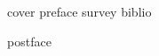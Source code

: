 \documentclass[utf8x, sts, 14pt, a4paper,oneside,fleqn]{extarticle}
\begin{document}
    \begin{onehalfspacing}
        {cover}
        {preface}
        \pagebreak
        \tableofcontents
        \pagebreak
        \pagebreak
        {survey}
        \pagebreak
        {biblio}

        {postface}
        \printindex
    \end{onehalfspacing}
\end{document}
